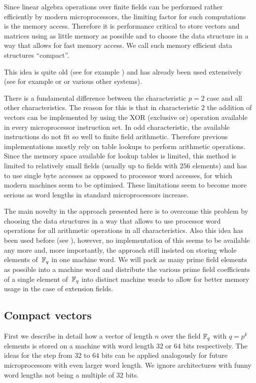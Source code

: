 Since linear algebra operations over finite fields can be performed
rather efficiently by modern microprocessors, the limiting factor 
for such computations is the memory access. Therefore it is performance
critical to store vectors and matrices using as little memory as possible
and to choose the data structure in a way that allows for fast memory
access. We call such memory efficient data structures ``compact''.

This idea is quite old (see for example \cite{MeatAxeRP}) and has already 
been used extensively (see for example \cite{CMeatAxe} or \cite{GAP4} or
various other systems).

There is a fundamental difference between the characteristic $p=2$ case
and all other characteristics. The reason for this is that in
characteristic $2$ the addition of vectors can be implemented by using
the XOR (exclusive or) operation available in every microprocessor
instruction set. In odd characteristic, the available instructions
do not fit so well to finite field arithmetic. Therefore previous
implementations mostly rely on table lookups to perform arithmetic
operations. Since the memory space available for lookup tables is
limited, this method is limited to relatively small fields (usually up to
fields with $256$ elements) and has to use single byte accesses
as opposed to processor word accesses, for which modern machines
seem to be optimised. These limitations seem to become more serious
as word lengths in standard microprocessors increase.

The main novelty in the approach presented here is to overcome this
problem by choosing the data structures in a way that allows to use
processor word operations for all arithmetic operations in all
characteristics. Also this idea has been used before (see
\cite{EssenLinAlg}), however, no implementation of this seems to
be available any more and, more importantly, the approach still
insisted on storing whole elements of\, $\mathbb{F}_q$ in one machine word.
We will pack as many prime field elements as possible into a machine
word and distribute the various prime field coefficients of a single
element of\, $\mathbb{F}_q$ into distinct machine words to allow for better
memory usage in the case of extension fields.


\subsection{Compact vectors}
\label{ssec:cvec}

First we describe in detail how a vector of length $n$ over the field
$\mathbb{F}_q$ with $q=p^k$ elements is stored on a machine with word length $32$ 
or $64$ bits respectively. The ideas for the step from $32$ to $64$ bits
can be applied analogously for future microprocessors with even larger
word length. We ignore architectures with funny word lengths not being
a multiple of $32$ bits.

